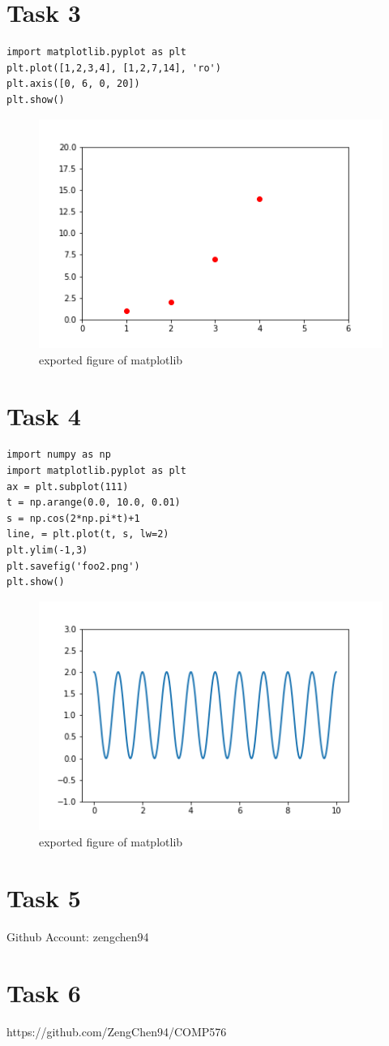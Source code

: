 \documentclass[paper=a4, fontsize=11pt]{scrartcl} %
\numberwithin{equation}{section} %
\numberwithin{figure}{section} %
\numberwithin{table}{section} %
\begin{document}
\section{Task 3}
\begin{verbatim}
import matplotlib.pyplot as plt
plt.plot([1,2,3,4], [1,2,7,14], 'ro')
plt.axis([0, 6, 0, 20])
plt.show()
\end{verbatim}
\begin{figure}[H]
 	\centering
 	\includegraphics[scale=0.75]{./../foo1.png}
 	\caption{exported figure of matplotlib}
 	\label{fig:matplotlib_output}
\end{figure}

\section{Task 4}
\begin{verbatim}
import numpy as np
import matplotlib.pyplot as plt
ax = plt.subplot(111)
t = np.arange(0.0, 10.0, 0.01)
s = np.cos(2*np.pi*t)+1
line, = plt.plot(t, s, lw=2)
plt.ylim(-1,3)
plt.savefig('foo2.png')
plt.show()
\end{verbatim}
\begin{figure}[H]
 	\centering
 	\includegraphics[scale=0.75]{./../foo2.png}
 	\caption{exported figure of matplotlib}
 	\label{fig:matplotlib_output}
\end{figure}

\section{Task 5}
Github Account: zengchen94

\section{Task 6}
https://github.com/ZengChen94/COMP576
\end{document}
